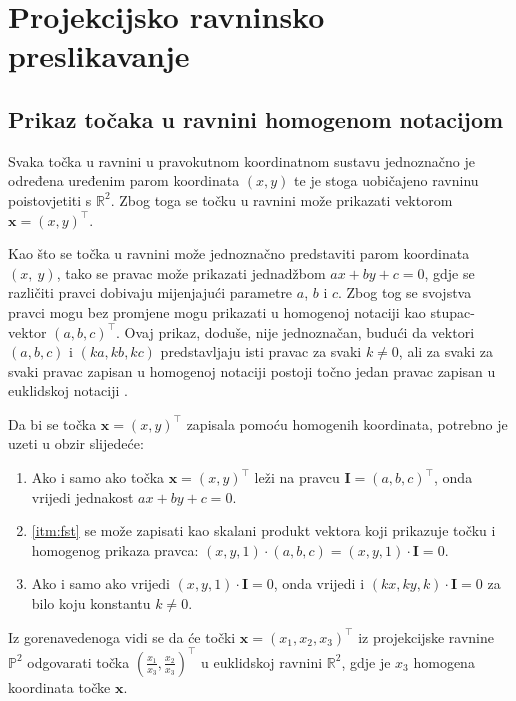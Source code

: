 \chapter{Projekcijsko ravninsko preslikavanje}
\label{ch:preslikavanje}

\section{Prikaz točaka u ravnini homogenom notacijom}
\label{sec:homNot}

Svaka točka u ravnini u pravokutnom koordinatnom sustavu jednoznačno je određena uređenim parom koordinata $(x, y)$ te je stoga uobičajeno ravninu poistovjetiti s $\mathbb{R}^2$. Zbog toga se točku u ravnini može prikazati vektorom $\mathbf{x} = (x, y)^\top$.

Kao što se točka u ravnini može jednoznačno predstaviti  parom koordinata $(x,~y)$, tako se pravac može prikazati jednadžbom $ax + by + c = 0$, gdje se različiti pravci dobivaju mijenjajući parametre $a$, $b$ i $c$. Zbog tog se svojstva pravci mogu bez promjene mogu prikazati u homogenoj notaciji kao stupac-vektor $(a, b, c)^\top$. Ovaj prikaz, doduše, nije jednoznačan, budući da vektori $(a, b, c)$ i $(ka, kb, kc)$ predstavljaju isti pravac za svaki $k \neq 0$, ali za svaki za svaki pravac zapisan u homogenoj notaciji postoji točno jedan pravac zapisan u euklidskoj notaciji \citep{Hartley2004}.

Da bi se točka $\mathbf{x} = (x, y)^\top$ zapisala pomoću homogenih koordinata, potrebno je uzeti u obzir slijedeće:
\begin{enumerate}
	\item \label{itm:fst} Ako i samo ako točka $\mathbf{x} = (x, y)^\top$ leži na pravcu $\mathbf{I} =(a, b, c)^\top$, onda vrijedi jednakost $ax + by + c = 0$.
	\item \eqref{itm:fst}  se može zapisati kao skalani produkt vektora koji prikazuje točku i homogenog prikaza pravca: $(x, y, 1) \cdot (a, b, c) = (x, y, 1) \cdot \mathbf{I} = 0$.
	\item Ako i samo ako vrijedi $(x, y, 1) \cdot \mathbf{I} = 0$, onda vrijedi i  $(kx, ky, k) \cdot \mathbf{I} = 0$ za bilo koju konstantu $k \neq 0$.
\end{enumerate}

Iz gorenavedenoga vidi se da će točki $\mathbf{x} = (x_1, x_2, x_3)^\top$ iz projekcijske ravnine $\mathbb{P}^2$ odgovarati točka $(\frac{x_1}{x_3}, \frac{x_2}{x_3})^\top$ u euklidskoj ravnini $\mathbb{R}^2$, gdje je $x_3$ homogena koordinata točke $\mathbf{x}$.

